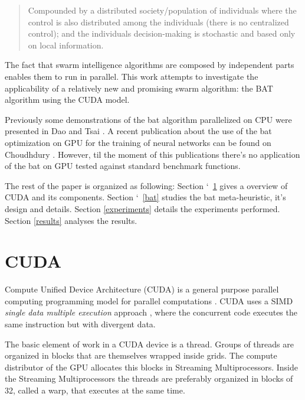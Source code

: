 \documentclass[conference]{IEEEtran}
\begin{document}
\begin{quote} Compounded by a distributed society/population of
individuals where the control is also distributed among the individuals
(there is no centralized control); and the individuals decision-making
is stochastic and based only on local information.\end{quote}

The fact that swarm intelligence algorithms are composed by
independent parts enables them to run in parallel. This work attempts
to investigate the applicability of a relatively new and promising
swarm algorithm: the BAT algorithm using the CUDA model. 

Previously some demonstrations of the bat algorithm parallelized on CPU
were presented in Dao \cite{paralellCPUFirst} and Tsai \cite{paralellCPU}. A
recent publication about the use of the bat optimization on GPU for the training of neural networks can be found on
Choudhdury \cite{firstBatGPU}. However, til the moment of this publications
there's no application of the bat on GPU tested against standard
benchmark functions.

The rest of the paper is organized as following: Section `~\ref{cuda}
gives a overview of CUDA and its components. Section `~\ref{bat}
studies the bat meta-heuristic, it's design and details. Section
\ref{experiments} details the experiments performed. Section
\ref{results} analyses the results.


\section{CUDA} \label{cuda}%

Compute Unified Device Architecture (CUDA) is a general purpose
parallel computing programming model for parallel computations
\cite{cudaDefinition}. CUDA uses a SIMD \textit{single data multiple
execution} approach \cite{gpuOptimization}, where the concurrent code
executes the same instruction but with divergent data.


The basic element of work in a CUDA device is a thread. Groups of
threads are organized in blocks that are themselves wrapped inside
grids. The compute distributor of the GPU allocates this blocks in
Streaming Multiprocessors. Inside the Streaming Multiprocessors the
threads are preferably organized in blocks of 32, called a warp, that
executes at the same time.
\end{document}
